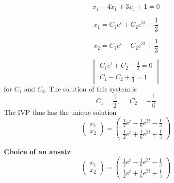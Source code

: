 \begin{equation}
  \ddot{x}_1 -4\dot{x}_1 + 3x_1 + 1 = 0
\end{equation}

\begin{equation}
  x_1 = C_1 e^t + C_2 e^{3t} - \frac{1}{3}
\end{equation}

\begin{equation}
  x_2 = C_1 e^t - C_2 e^{3t} + \frac{1}{3}
\end{equation}



\begin{equation}
  \begin{vmatrix}
    C_1 e^t + C_2 - \frac{1}{3} = 0\\
    C_1 - C_2 + \frac{1}{3} = 1
  \end{vmatrix}
\end{equation}
for $C_1$ and $C_2$. The solution of this system is
\begin{equation}
  C_1 = \frac{1}{2}, \;\;\;\;\; C_2 = -\frac{1}{6}
\end{equation}
The IVP thus has the unique solution
\begin{equation}
  \begin{pmatrix} x_1 \\ x_2 \end{pmatrix} =
  \begin{pmatrix}
    \frac{1}{2}e^t - \frac{1}{6}e^{3t} - \frac{1}{3}\\
    \frac{1}{2}e^t + \frac{1}{6}e^{3t} + \frac{1}{3}
  \end{pmatrix}
\end{equation}


\textbf{Choice of an ansatz}\\
\begin{equation}
  \begin{pmatrix} x_1 \\ x_2 \end{pmatrix} =
  \begin{pmatrix}
    \frac{1}{2}e^t - \frac{1}{6}e^{3t} - \frac{1}{3}\\
    \frac{1}{2}e^t + \frac{1}{6}e^{3t} + \frac{1}{3}
  \end{pmatrix}
\end{equation}
